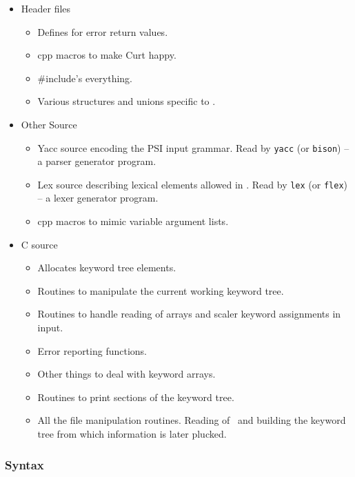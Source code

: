 \begin{itemize}
\item Header files
  \begin{itemize}
  \item {} Defines for error return values.
  \item {} cpp macros to make Curt happy.
  \item {} \#include's everything.
  \item {} Various structures and unions specific to
                          .
  \end{itemize}
\item Other Source
  \begin{itemize}
  \item {} Yacc source encoding the PSI input grammar.
  Read by {\tt yacc} (or {\tt bison}) -- a parser generator program. 
  \item {} Lex source describing lexical elements allowed
  in . Read by {\tt lex} (or {\tt flex}) -- a lexer generator
  program. 
  \item {} cpp macros to mimic variable argument lists.
  \end{itemize}
\item C source
  \begin{itemize} 
  \item {} Allocates keyword tree elements.
  \item {} Routines to manipulate the current working keyword
                       tree.
  \item {}  Routines to handle reading of arrays and scaler
                         keyword assignments in input.
  \item {} Error reporting functions.
  \item {} Other things to deal with keyword arrays.
  \item {} Routines to print sections of the keyword tree.
  \item {} All the file manipulation routines.  Reading of 
                  \ and building the keyword tree from
                  which information is later plucked.
  \end{itemize}
\end{itemize}

\subsubsection{Syntax}

